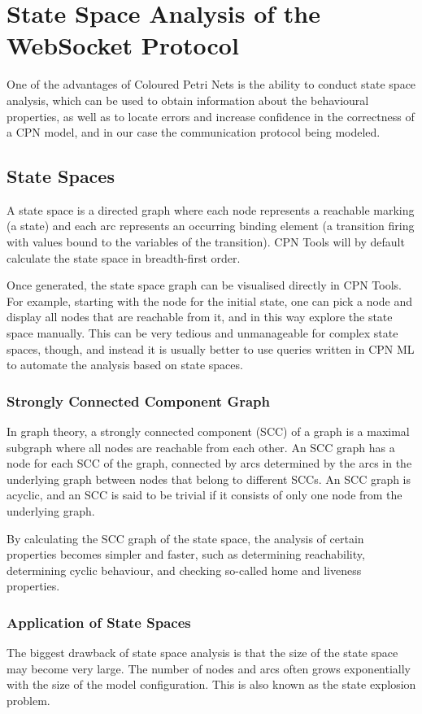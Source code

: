 \chapter{State Space Analysis of the WebSocket Protocol}
\label{chap:statespace}

One of the advantages of Coloured Petri Nets is the ability to conduct state
space analysis, which can be used to obtain information about the
behavioural properties, as well as to locate errors
and increase confidence in the correctness of a CPN model, and in our case the
communication protocol being modeled.

\section{State Spaces}
A state space is a directed graph where each node represents a reachable marking
(a state) and each arc represents an occurring binding element (a transition
firing with values bound to the variables of the transition). CPN Tools will
by default calculate the state space in breadth-first order. 

Once generated, the state space graph can be visualised directly in CPN Tools.
For example, starting with the node for the initial state, one can pick a node
and display all nodes that are reachable from it, and in this way explore the state space
manually. This can be very tedious and unmanageable for complex state spaces,
though, and instead it is usually better to use queries written in CPN ML to
automate the analysis based on state spaces.

	\subsection{Strongly Connected Component Graph}
	In graph theory, a strongly connected component (SCC) of a graph is a maximal
	subgraph where all nodes are reachable from each other. An SCC graph has a node
	for each SCC of the graph, connected by arcs determined by the arcs in the
	underlying graph between nodes that belong to different SCCs. An
	SCC graph is acyclic, and an SCC is said to be trivial if it consists of only
	one node from the underlying graph.
	
	By calculating the SCC graph of the state space, the analysis of certain
	properties becomes simpler and faster, such as determining reachability,
	determining cyclic behaviour, and checking so-called home and liveness
	properties.

	\subsection{Application of State Spaces}
		The biggest drawback of state space analysis is that the size of the state
		space may become very large. The number of nodes and arcs often grows exponentially
		with the size of the model configuration.
		This is also known as the state explosion problem.
		
